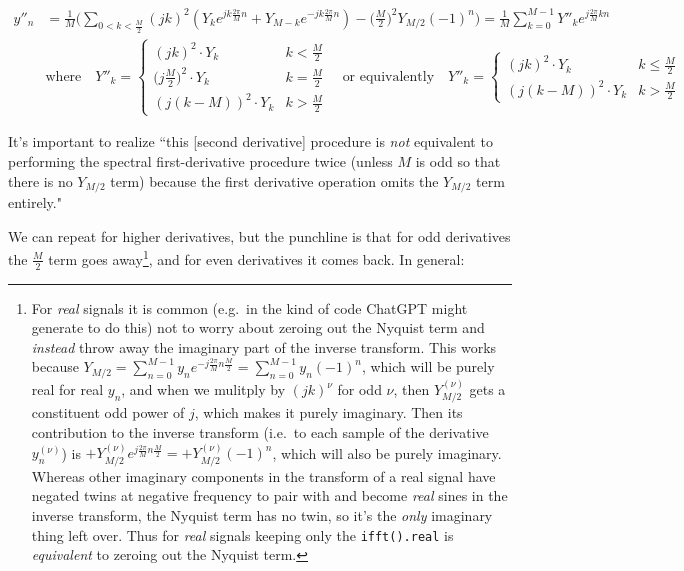 \documentclass[10pt]{article}
\begin{document}
\begin{align*}
y''_n &= \frac{1}{M} \Big( \sum_{0 < k < \frac{M}{2}} (jk)^2 (Y_k e^{j k \frac{2\pi}{M}n} + Y_{M-k} e^{-j k \frac{2\pi}{M}n}) - \Big(\frac{M}{2}\Big)^2 Y_{M/2} (-1)^n \Big) = \frac{1}{M} \sum_{k = 0}^{M-1} Y''_k e^{j\frac{2\pi}{M}kn} \\
& \text{where} \quad Y''_k = \begin{cases} (j k)^2 \cdot Y_k & k < \frac{M}{2} \\ \Big(j\frac{M}{2}\Big)^2 \cdot Y_k & k = \frac{M}{2} \\ (j(k - M))^2 \cdot Y_k & k > \frac{M}{2} \end{cases} \quad \text{or equivalently} \quad Y''_k = \begin{cases} (j k)^2 \cdot Y_k & k \leq \frac{M}{2} \\ (j(k - M))^2 \cdot Y_k & k > \frac{M}{2} \end{cases}
\end{align*}

It's important to realize ``this [second derivative] procedure is \textit{not} equivalent to performing the spectral first-derivative procedure twice (unless $M$ is odd so that there is no $Y_{M/2}$ term) because the first derivative operation omits the $Y_{M/2}$ term entirely."\cite{johnson}

We can repeat for higher derivatives, but the punchline is that for odd derivatives the $\frac{M}{2}$ term goes away\footnote{For \textit{real} signals it is common (e.g.~in the kind of code ChatGPT might generate to do this) not to worry about zeroing out the Nyquist term and \textit{instead} throw away the imaginary part of the inverse transform. This works because $Y_{M/2} = \sum_{n=0}^{M-1} y_n e^{-j\frac{2\pi}{M} n \frac{M}{2}} = \sum_{n=0}^{M-1} y_n (-1)^n$, which will be purely real for real $y_n$, and when we mulitply by $(jk)^\nu$ for odd $\nu$, then $Y_{M/2}^{(\nu)}$ gets a constituent odd power of $j$, which makes it purely imaginary. Then its contribution to the inverse transform (i.e.~to each sample of the derivative $y_n^{(\nu)}$) is $+Y_{M/2}^{(\nu)} e^{j\frac{2\pi}{M}n\frac{M}{2}} = +Y_{M/2}^{(\nu)} (-1)^n$, which will also be purely imaginary. Whereas other imaginary components in the transform of a real signal have negated twins at negative frequency to pair with and become \textit{real} sines in the inverse transform, the Nyquist term has no twin, so it's the \textit{only} imaginary thing left over. Thus for \textit{real} signals keeping only the \texttt{ifft().real} is \textit{equivalent} to zeroing out the Nyquist term.}, and for even derivatives it comes back. In general:
\end{document}
